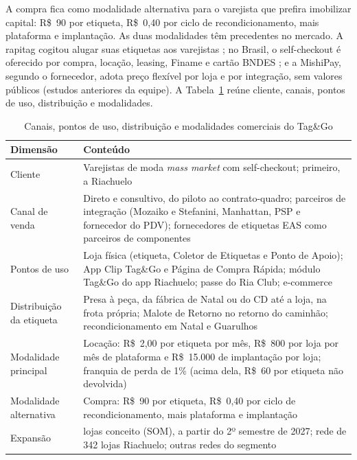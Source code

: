 A compra fica como modalidade alternativa para o varejista que prefira imobilizar capital: R\$~90 por etiqueta, R\$~0,40 por ciclo de recondicionamento, mais plataforma e implantação. As duas modalidades têm precedentes no mercado. A rapitag cogitou alugar suas etiquetas aos varejistas \cite{munichstartup2017rapitag,storesshops2019rapitag}; no Brasil, o self-checkout é oferecido por compra, locação, leasing, Finame e cartão BNDES \cite{perto2021selfcheckout}; e a MishiPay, segundo o fornecedor, adota preço flexível por loja e por integração, sem valores públicos (estudos anteriores da equipe). A Tabela~\ref{tab:r2-canais} reúne cliente, canais, pontos de uso, distribuição e modalidades.

\begin{table}[htbp]
    \centering
    \caption{Canais, pontos de uso, distribuição e modalidades comerciais do Tag\&Go}
    \label{tab:r2-canais}
    \footnotesize
    \renewcommand{\arraystretch}{1.25}
    \begin{tabularx}{\textwidth}{@{}
        >{\RaggedRight\arraybackslash}p{3.2cm}
        >{\RaggedRight\arraybackslash}X@{}}
        \toprule
        \textbf{Dimensão} & \textbf{Conteúdo} \\
        \midrule
        Cliente & Varejistas de moda \textit{mass market} com self-checkout; primeiro, a Riachuelo \\
        Canal de venda & Direto e consultivo, do piloto ao contrato-quadro; parceiros de integração (Mozaiko e Stefanini, Manhattan, PSP e fornecedor do PDV); fornecedores de etiquetas EAS como parceiros de componentes \\
        Pontos de uso & Loja física (etiqueta, Coletor de Etiquetas e Ponto de Apoio); App Clip Tag\&Go e Página de Compra Rápida; módulo Tag\&Go do app Riachuelo; passe do Ria Club; e-commerce \\
        Distribuição da etiqueta & Presa à peça, da fábrica de Natal ou do CD até a loja, na frota própria; Malote de Retorno no retorno do caminhão; recondicionamento em Natal e Guarulhos \\
        Modalidade principal & Locação: R\$~2,00 por etiqueta por mês, R\$~800 por loja por mês de plataforma e R\$~15.000 de implantação por loja; franquia de perda de 1\% (acima dela, R\$~60 por etiqueta não devolvida) \\
        Modalidade alternativa & Compra: R\$~90 por etiqueta, R\$~0,40 por ciclo de recondicionamento, mais plataforma e implantação \\
        Expansão & 20 lojas conceito (SOM), a partir do 2º semestre de 2027; rede de 342 lojas Riachuelo; outras redes do segmento \\
        \bottomrule
    \end{tabularx}
\end{table}

